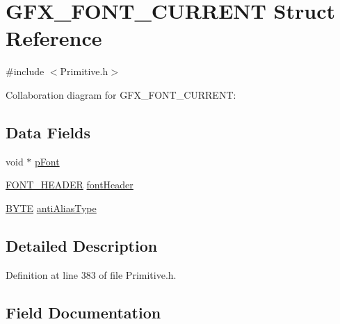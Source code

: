 \hypertarget{struct_g_f_x___f_o_n_t___c_u_r_r_e_n_t}{}\section{G\+F\+X\+\_\+\+F\+O\+N\+T\+\_\+\+C\+U\+R\+R\+E\+N\+T Struct Reference}
\label{struct_g_f_x___f_o_n_t___c_u_r_r_e_n_t}


{\ttfamily \#include $<$Primitive.\+h$>$}



Collaboration diagram for G\+F\+X\+\_\+\+F\+O\+N\+T\+\_\+\+C\+U\+R\+R\+E\+N\+T\+:
\subsection*{Data Fields}
\begin{DoxyCompactItemize}
\item 
void $\ast$ \hyperlink{struct_g_f_x___f_o_n_t___c_u_r_r_e_n_t_a4a1009bfded2760eeec21b35ed171151}{p\+Font}
\item 
\hyperlink{struct_f_o_n_t___h_e_a_d_e_r}{F\+O\+N\+T\+\_\+\+H\+E\+A\+D\+E\+R} \hyperlink{struct_g_f_x___f_o_n_t___c_u_r_r_e_n_t_a8c0a3bdd37d2f1812be75475c6226aac}{font\+Header}
\item 
\hyperlink{_generic_type_defs_8h_a4ae1dab0fb4b072a66584546209e7d58}{B\+Y\+T\+E} \hyperlink{struct_g_f_x___f_o_n_t___c_u_r_r_e_n_t_ade821424697142b662b3130653b64f70}{anti\+Alias\+Type}
\end{DoxyCompactItemize}


\subsection{Detailed Description}


Definition at line 383 of file Primitive.\+h.



\subsection{Field Documentation}
\hypertarget{struct_g_f_x___f_o_n_t___c_u_r_r_e_n_t_ade821424697142b662b3130653b64f70}{}

